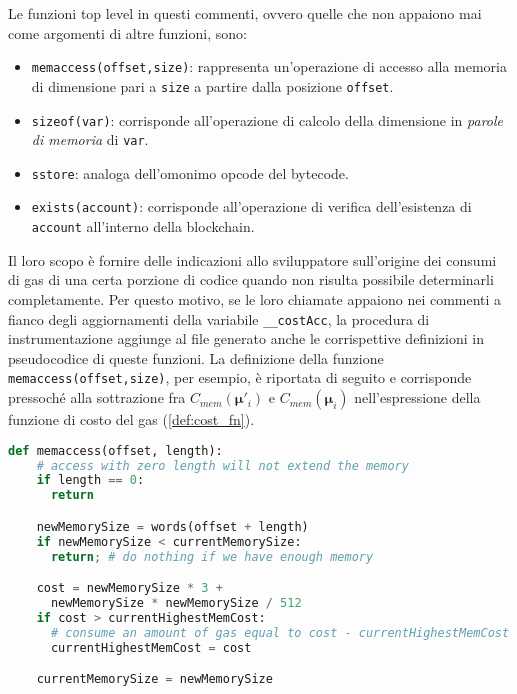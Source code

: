 \documentclass[12pt,a4paper,openright,oneside]{report}
\theoremstyle{definition}
\begin{document}
Le funzioni top level in questi commenti, ovvero quelle che non appaiono mai come argomenti di altre funzioni, sono:
\begin{itemize}
    \item \texttt{memaccess(offset,size)}: rappresenta un'operazione di accesso alla memoria di dimensione pari a \texttt{size} a partire dalla posizione \texttt{offset}.
    \item \texttt{sizeof(var)}: corrisponde all'operazione di calcolo della dimensione in \textit{parole di memoria} di \texttt{var}.
    \item \texttt{sstore}: analoga dell'omonimo opcode del bytecode.
    \item \texttt{exists(account)}: corrisponde all'operazione di verifica dell'esistenza di \texttt{account} all'interno della blockchain.
\end{itemize}
Il loro scopo \`{e} fornire delle indicazioni allo sviluppatore sull'origine dei consumi di gas di una certa porzione di codice quando non risulta possibile determinarli completamente. Per questo motivo, se le loro chiamate appaiono nei commenti a fianco degli aggiornamenti della variabile \texttt{\_\_costAcc}, la procedura di instrumentazione aggiunge al file generato anche le corrispettive definizioni in pseudocodice di queste funzioni. La definizione della funzione \texttt{memaccess(offset,size)}, per esempio, \`{e} riportata di seguito e corrisponde pressoch\'{e} alla sottrazione fra $C_{mem}(\boldsymbol{\mu}'_i)$ e $C_{mem}(\boldsymbol{\mu}_i)$ nell'espressione della funzione di costo del gas (\ref{def:cost_fn}).
\begin{lstlisting}[language=Python,caption={Pseudocodice della funzione \texttt{memaccess(offset,size)}}]
def memaccess(offset, length):
    # access with zero length will not extend the memory
    if length == 0:
      return

    newMemorySize = words(offset + length)
    if newMemorySize < currentMemorySize:
      return; # do nothing if we have enough memory

    cost = newMemorySize * 3 +
      newMemorySize * newMemorySize / 512
    if cost > currentHighestMemCost:
      # consume an amount of gas equal to cost - currentHighestMemCost
      currentHighestMemCost = cost

    currentMemorySize = newMemorySize
\end{lstlisting}
\end{document}
